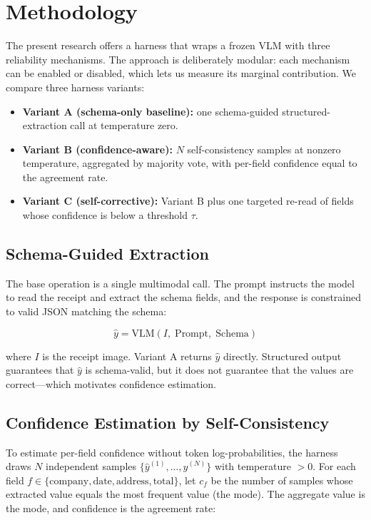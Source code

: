 \documentclass[conference]{IEEEtran}
\begin{document}
\section{Methodology}
\label{sec:method}

The present research offers a harness that wraps a frozen VLM with three reliability mechanisms. The approach is deliberately modular: each mechanism can be enabled or disabled, which lets us measure its marginal contribution. We compare three harness variants:

\begin{itemize}
    \item \textbf{Variant A (schema-only baseline):} one schema-guided structured-extraction call at temperature zero.
    \item \textbf{Variant B (confidence-aware):} \(N\) self-consistency samples at nonzero temperature, aggregated by majority vote, with per-field confidence equal to the agreement rate.
    \item \textbf{Variant C (self-corrective):} Variant B plus one targeted re-read of fields whose confidence is below a threshold \(\tau\).
\end{itemize}

\subsection{Schema-Guided Extraction}
The base operation is a single multimodal call. The prompt instructs the model to read the receipt and extract the schema fields, and the response is constrained to valid JSON matching the schema:

\[
\hat{y} = \text{VLM}(I,\; \text{Prompt},\; \text{Schema})
\]

where \(I\) is the receipt image. Variant A returns \(\hat{y}\) directly. Structured output guarantees that \(\hat{y}\) is schema-valid, but it does not guarantee that the values are correct---which motivates confidence estimation.

\subsection{Confidence Estimation by Self-Consistency}
To estimate per-field confidence without token log-probabilities, the harness draws \(N\) independent samples \(\{\hat{y}^{(1)}, \ldots, \hat{y}^{(N)}\}\) with temperature \(> 0\). For each field \(f \in \{\text{company}, \text{date}, \text{address}, \text{total}\}\), let \(c_f\) be the number of samples whose extracted value equals the most frequent value (the mode). The aggregate value is the mode, and confidence is the agreement rate:
\end{document}
